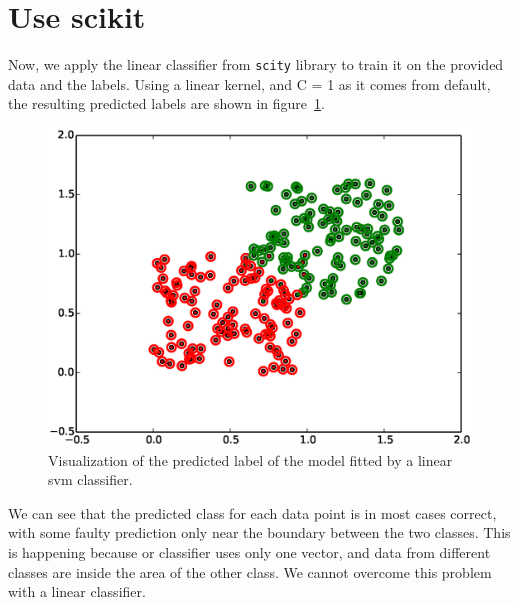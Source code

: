 \documentclass[a4paper,10pt]{article}
\begin{document}
\section{Use scikit}
Now, we apply the linear classifier from \texttt{scity} library to train it on the provided data and the labels. Using a linear kernel, and C = 1 as it comes from default, the resulting predicted labels are shown in figure~\ref{fig:linearClass}.
\begin{figure}[ht!]
    \centering
    \includegraphics[width=1.00\textwidth]{svmFit.eps}
    \caption{Visualization of the predicted label of the model fitted by a linear svm classifier.}
    \label{fig:linearClass}
\end{figure}
We can see that the predicted class for each data point is in most cases correct, with some faulty prediction only near the boundary between the two classes. This is happening because or classifier uses only one vector, and data from different classes are inside the area of the other class. We cannot overcome this problem with a linear classifier.
    
\end{document}
